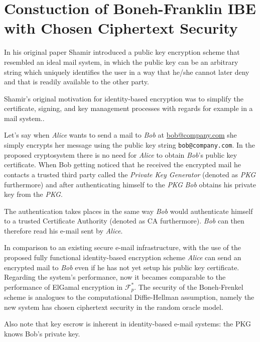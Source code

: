 \section{Constuction of Boneh-Franklin IBE with Chosen Ciphertext Security}

In his original paper \cite{Shamir41} Shamir introduced a public key encryption
scheme that resembled an ideal mail system, in which the public key can be an
arbitrary string which  uniquely identifies the user in a way that he/she
cannot later deny and that is readily available to the other party.\cite{Shamir41}

Shamir's original motivation for identity-based encryption was to simplify the
certificate, signing, and key management processes with regards
for example in a mail system.\cite{BF01}.

Let's say when \textit{Alice} wants to send  a mail to \textit{Bob} at \url{bob@company.com}
she simply encrypts her message using the public key string \lstinline{bob@company.com}. 
In the proposed cryptosystem there is no need for \textit{Alice} to obtain \textit{Bob}’s public key
certificate. When Bob getting noticed that he received the encrypted mail he contacts a trusted
third party called the \textit{Private Key Generator} (denoted as \textit{PKG}  furthermore) and 
after authenticating himself to the \textit{PKG} \textit{Bob} obtains his private key
from the \textit{PKG}. \cite{BF01}

The authentication takes places in the same way \textit{Bob} would authenticate
himself to a trusted Certificate Authority (denoted as CA furthermore).
\textit{Bob} can then therefore read his e-mail sent by \textit{Alice}.

In comparison to an existing secure e-mail infrastructure,
with the use of the proposed fully functional
identity-based encryption scheme\cite{BF01}
\textit{Alice} can send an encrypted mail to \textit{Bob} even if he has not yet
setup his public key certificate. Regarding the system's performance,
now it becames comparable to the performance of
ElGamal encryption\cite{cryptosys.elgamal} in $\mathcal{F}^{*}_p$. The security of the
Boneh-Frenkel scheme is analogues to the computational Diffie-Hellman assumption\cite{crypto.cdhddh},
namely the new system has chosen ciphertext security in the random oracle model\cite{Bellare1993}.


Also note that key escrow is inherent in identity-based
e-mail systems: the PKG knows Bob’s private key.


